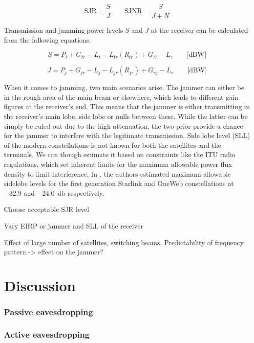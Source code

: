 \documentclass[english, 12pt, a4paper, elec, utf8, a-1b, online]{aaltothesis}
\begin{document}
\begin{equation*}
  \text{SJR} = \frac{S}{J} \qquad
  \text{SJNR} = \frac{S}{J+N}
\end{equation*}

Transmission and jamming power levels $S$ and $J$ at the receiver can be calculated from the following equations.

\begin{equation}
  S = P_t + G_{tr}-L_t-L_{tr}(R_{tr})+G_{rt}-L_r \qquad \text{[dBW]}
\end{equation}

\begin{equation}
  J = P_j + G_{jr}-L_j-L_{jr}(R_{jr})+G_{rj}-L_r \qquad \text{[dBW]}
\end{equation}

When it comes to jamming, two main scenarios arise. The jammer can either be in the rough area of the main beam or elsewhere, which leads to different gain figures at the receiver's end. This means that the jammer is either transmitting in the receiver's main lobe, side lobe or nulls between these. While the latter can be simply be ruled out due to the high attenuation, the two prior provide a chance for the jammer to interfere with the legitimate transmission. Side lobe level (SLL) of the modern constellations is not known for both the satellites and the terminals. We can though estimate it based on constraints like the ITU radio regulations, which set inherent limits for the maximum allowable power flux density to limit interference. In \cite{hills2023controlling}, the authors estimated maximum allowable sidelobe levels for the first generation Starlink and OneWeb constellations at $-32.9$ and \qty{-24.0}{\decibel} respectively.

Choose acceptable SJR level

Vary EIRP or jammer and SLL of the receiver

Effect of large number of satellites, switching beams. Predictability of frequency pattern -> effect on the jammer?

\section{Discussion}
\subsubsection{Passive eavesdropping}
\subsubsection{Active eavesdropping}
\end{document}
